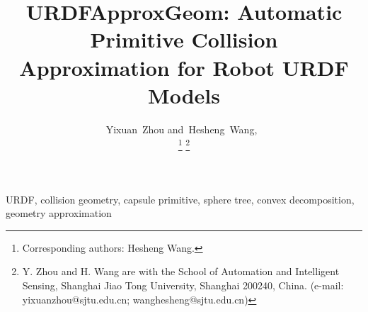 \documentclass[journal]{IEEEtran}
\title{URDFApproxGeom: Automatic Primitive Collision\\Approximation for Robot URDF Models}
\author{
  Yixuan~Zhou
  and~Hesheng~Wang,~\IEEEmembership{Senior~Member,~IEEE}

  \thanks{Corresponding authors: Hesheng Wang.}
  \thanks{Y. Zhou and H. Wang are with the School of Automation and Intelligent Sensing, Shanghai Jiao Tong University, Shanghai 200240, China. (e-mail: yixuanzhou@sjtu.edu.cn; wanghesheng@sjtu.edu.cn)}
}
\begin{document}
\maketitle

\begin{abstract}

\end{abstract}

\begin{IEEEkeywords}
URDF, collision geometry, capsule primitive, sphere tree, convex decomposition, geometry approximation
\end{IEEEkeywords}












\end{document}
